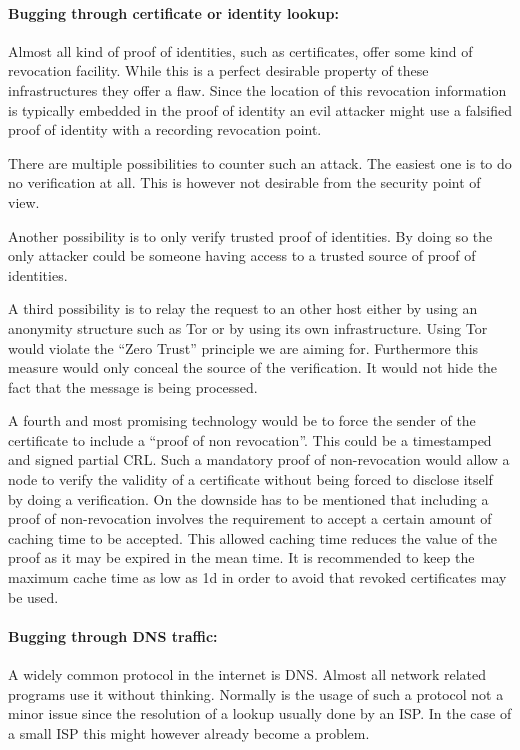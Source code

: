 \paragraph{Bugging through certificate or identity lookup:} Almost all kind of proof of identities, such as certificates, offer some kind of revocation facility. While this is a perfect desirable property of these infrastructures they offer a flaw. Since the location of this revocation information is typically embedded in the proof of identity an evil attacker might use a falsified proof of identity with a recording revocation point.
	      
There are multiple possibilities to counter such an attack. The easiest one is to do no verification at all. This is however not desirable from the security point of view. 

Another possibility is to only verify trusted proof of identities. By doing so the only attacker could be someone having access to a trusted source of proof of identities. 

A third possibility is to relay the request to an other host either by using an anonymity structure such as Tor or by using its own infrastructure. Using Tor would violate the ``Zero Trust'' principle we are aiming for. Furthermore this measure would only conceal the source of the verification. It would not hide the fact that the message is being processed. 

A fourth and most promising technology would be to force the sender of the certificate to include a ``proof of non revocation''. This could be a timestamped and signed partial CRL. Such a mandatory proof of non-revocation would allow a node to verify the validity of a certificate without being forced to disclose itself by doing a verification. On the downside has to be mentioned that including a proof of non-revocation involves the requirement to accept a certain amount of caching time to be accepted. This allowed caching time reduces the value of the proof as it may be expired in the mean time. It is recommended to keep the maximum cache time as low as 1d in order to avoid that revoked certificates may be used. 

\paragraph{Bugging through DNS traffic:} A widely common protocol in the internet is DNS. Almost all network related programs use it without thinking. Normally is the usage of such a protocol not a minor issue since the resolution of a lookup usually done by an ISP. In the case of a small ISP this might however already become a problem.

